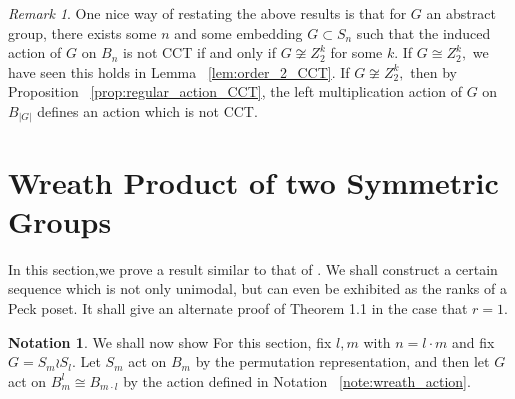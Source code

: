 \documentclass[10 pt]{amsart}
\theoremstyle{plain}
\newtheorem{prop}[thm]{Proposition}
\theoremstyle{definition}
\newtheorem{note}[thm]{Notation}
\theoremstyle{remark}
\newtheorem{rem}[thm]{Remark}
\numberwithin{equation}{section}
\newcommand\BR{{\mathbb R}}
\newcommand\BZ{{\mathbb Z}}
\begin{document}
\begin{rem}
One nice way of restating the above results is that for $G$ an abstract group, there exists some $n$ and some embedding $G \subset S_n$ such that the induced action of $G$ on $B_n$ is not CCT if and only if $G \not \cong Z_2^k$ for some $k.$ If $G\cong Z_2^k,$ we have seen this holds in Lemma ~\ref{lem:order_2_CCT}. If $G \not \cong Z_2^k,$ then by Proposition ~\ref{prop:regular_action_CCT}, the left multiplication action of $G$ on $B_{|G|}$ defines an action which is not CCT.
\end{rem}
\iffalse
\begin{prop}
Let $G$ be the group of linear automorphisms of the cube, embedded in $\BR^n,$ whose vertices are located at the points $(\pm 1, \ldots, \pm 1).$ Then, the action of $G$ on the cube induces an action of $G$ on the $2^n$ vertices of the octahedron, and hence on $B_{2^n}.$ This induced action on $B_{2^n}$ is CCT. 
\end{prop}
\begin{proof}
It is easy to see that the group of linear automorphisms of the cube can be written as the semidirect product $\BZ^n_2 \rtimes S_n.$ The generator of the $i^{th}$ copy of $\BZ_2$ in $\BZ^n_2,$ acts by changing the sign of the $i^{th}$ coordinate, while $S_n$ acts by permuting the coordinates. Using Proposition ~\ref{prop:semidirect_product_preservation}, it suffices to show that the action of $\BZ_2^n$ on $B_{2^n}$ is CCT and the action of $S_n$ on $B_{2^n}/(\BZ_2^n)$ is CCT.

First, by Lemma ~\ref{lem:order_2_CCT}, we know the action of $\BZ_2^n$ on $B_{2^n}$ is CCT. Second, we wish to examine the action of $S_n$ on the quotient poset $B_{2^n}/(\BZ_2^n).$ 
\end{proof}
\fi






\section{Wreath Product of two Symmetric Groups}

In this section,we prove a result similar to that of \cite[Theorem 1.1]{pak}. We shall construct a certain sequence which is not only unimodal, but can even be exhibited as the ranks of a Peck poset. It shall give an alternate proof of Theorem 1.1 in the case that $r = 1.$

\begin{note}
We shall now show 
For this section, fix $l,m$ with $n = l \cdot m$ and fix $G = S_m \wr S_l.$ Let $S_m$ act on $B_m$ by the permutation representation, and then let $G$ act on $B_{m}^l\cong B_{m \cdot l}$ by the action defined in Notation ~\ref{note:wreath_action}.
\end{note}
\end{document}

